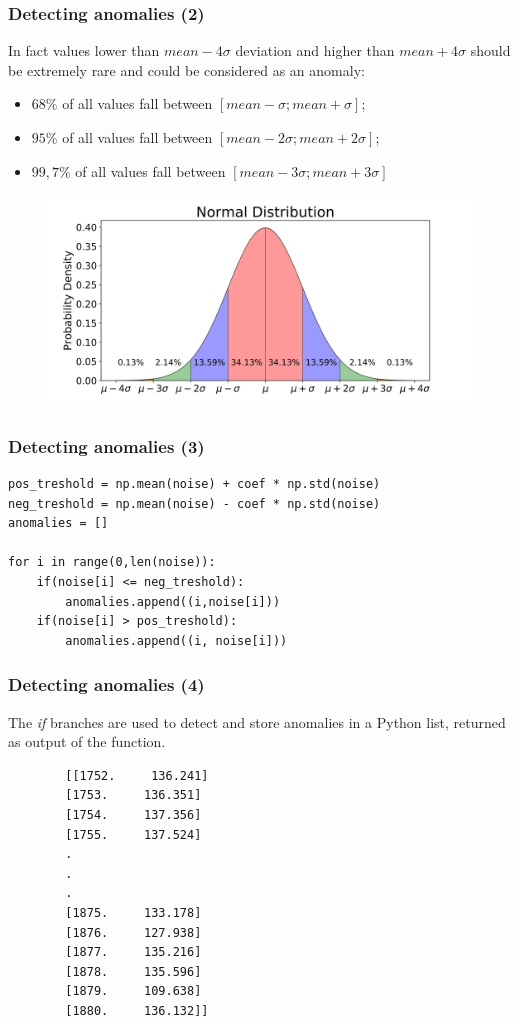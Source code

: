 \documentclass[xcolor ={table,usenames,dvipsnames}]{beamer}
\theoremstyle{definition}
\begin{document}
	\begin{frame}[fragile]
		\frametitle{Detecting anomalies (2)}
			In fact values lower than $mean-4\sigma$ deviation and higher than $mean + 4\sigma$ should be extremely rare and could be considered as an anomaly: 
		\begin{itemize}
			\item $68\%$ of all values fall between $[mean-\sigma; mean+\sigma]$;
			\item $95\%$ of all values fall between $[mean-2\sigma; mean+2\sigma]$; 
			\item $99,7\%$ of all values fall between $[mean-3\sigma; mean+3\sigma]$ 
		\end{itemize}
		
		\begin{figure}[h!]
			\centering
			\includegraphics[scale=0.05]{img/rule.png}
		\end{figure}
	\end{frame}

	\begin{frame}[fragile]
		\frametitle{Detecting anomalies (3)}
		\begin{lstlisting}
pos_treshold = np.mean(noise) + coef * np.std(noise)
neg_treshold = np.mean(noise) - coef * np.std(noise)
anomalies = []
		
for i in range(0,len(noise)):
	if(noise[i] <= neg_treshold):
		anomalies.append((i,noise[i]))
	if(noise[i] > pos_treshold):
		anomalies.append((i, noise[i]))
		\end{lstlisting}
	\end{frame}

	\begin{frame}[fragile]
		\frametitle{Detecting anomalies (4)}
					The \textit{if} branches are used to detect and store anomalies in a Python list, returned as output of the function. 
		
		\begin{lstlisting}
		[[1752.     136.241]
		[1753.     136.351]
		[1754.     137.356]
		[1755.     137.524]
		.
		.
		.
		[1875.     133.178]
		[1876.     127.938]
		[1877.     135.216]
		[1878.     135.596]
		[1879.     109.638]
		[1880.     136.132]]
		\end{lstlisting}
	\end{frame}	
\end{document}
